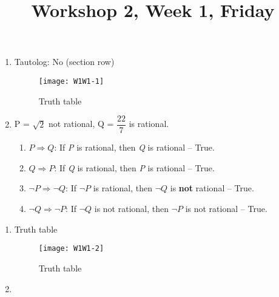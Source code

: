 \documentclass[danish,english,10pt,a4paper]{article}
\title{Workshop 2, Week 1, Friday}
\begin{document}
\maketitle

\begin{enumerate}
\item Tautolog: No (section row)
\begin{figure}[H]
\centering
\texttt{[image: W1W1-1]}
\caption{Truth table}
\label{fig:venn}
\end{figure}

\item P = $\sqrt{2}$ not rational, Q = $\dfrac{22}{7}$ is rational.
	\begin{enumerate}[a]
	\item $P \Rightarrow Q$: If \textit{P} is rational, then \textit{Q} is rational -- True.
	\item $Q \Rightarrow P$: If \textit{Q} is rational, then \textit{P} is rational -- True.
	\item $\neg P \Rightarrow \neg Q$: If $\neg P$ is rational, then $\neg Q$ is \textbf{not} rational -- True.
	\item $\neg Q \Rightarrow \neg P$: If $\neg Q$ is not rational, then $\neg P$ is not rational -- True.
	\end{enumerate}
\end{enumerate}

\newpage
\begin{enumerate}
\item Truth table
\begin{figure}[H]
\centering
\texttt{[image: W1W1-2]}
\caption{Truth table}
\label{fig:venn}
\end{figure}

\item 
\end{enumerate}
\end{document}
